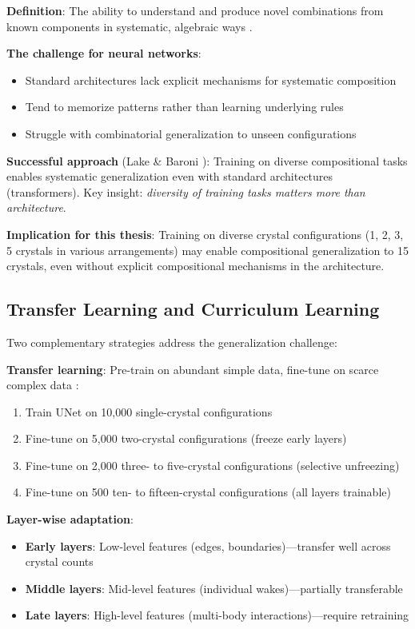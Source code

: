 \textbf{Definition}: The ability to understand and produce novel combinations from known components in systematic, algebraic ways \cite{lake2023systematic}.

\textbf{The challenge for neural networks}:
\begin{itemize}
    \item Standard architectures lack explicit mechanisms for systematic composition
    \item Tend to memorize patterns rather than learning underlying rules
    \item Struggle with combinatorial generalization to unseen configurations
\end{itemize}

\textbf{Successful approach} (Lake \& Baroni \cite{lake2023systematic}): Training on diverse compositional tasks enables systematic generalization even with standard architectures (transformers). Key insight: \textit{diversity of training tasks matters more than architecture}.

\textbf{Implication for this thesis}: Training on diverse crystal configurations (1, 2, 3, 5 crystals in various arrangements) may enable compositional generalization to 15 crystals, even without explicit compositional mechanisms in the architecture.

\subsection{Transfer Learning and Curriculum Learning}

Two complementary strategies address the generalization challenge:

\textbf{Transfer learning}: Pre-train on abundant simple data, fine-tune on scarce complex data \cite{pellegrin2022transfer}:
\begin{enumerate}
    \item Train UNet on 10,000 single-crystal configurations
    \item Fine-tune on 5,000 two-crystal configurations (freeze early layers)
    \item Fine-tune on 2,000 three- to five-crystal configurations (selective unfreezing)
    \item Fine-tune on 500 ten- to fifteen-crystal configurations (all layers trainable)
\end{enumerate}

\textbf{Layer-wise adaptation}:
\begin{itemize}
    \item \textbf{Early layers}: Low-level features (edges, boundaries)---transfer well across crystal counts
    \item \textbf{Middle layers}: Mid-level features (individual wakes)---partially transferable
    \item \textbf{Late layers}: High-level features (multi-body interactions)---require retraining
\end{itemize}

